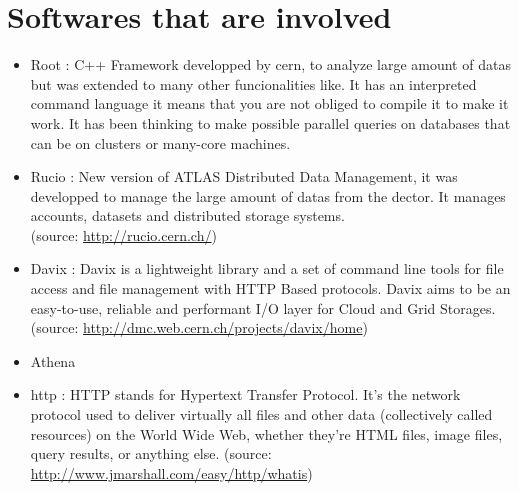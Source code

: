 \section{Softwares that are involved}

\begin{itemize}
\item Root : C++ Framework developped by cern, to analyze large amount of datas but was extended to many other funcionalities like. It has an interpreted command language it means that you are not obliged to compile it to make it work. It has been thinking to make possible parallel queries on databases that can be on clusters or many-core machines. \\

\item Rucio : New version of ATLAS Distributed Data Management, it was developped to manage the large amount of datas from the dector. It manages accounts, datasets and distributed storage systems.\\ (source: \url{http://rucio.cern.ch/}) 

\item Davix : Davix is a lightweight library and a set of command line tools for file access and file management with HTTP Based protocols. Davix aims to be an easy-to-use, reliable and performant I/O layer for Cloud and Grid Storages.\\ (source: \url{http://dmc.web.cern.ch/projects/davix/home})

\item Athena\\

\item http : HTTP stands for Hypertext Transfer Protocol. It's the network protocol used to deliver virtually all files and other data (collectively called resources) on the World Wide Web, whether they're HTML files, image files, query results, or anything else. (source: \url{http://www.jmarshall.com/easy/http/whatis})
\end{itemize}
